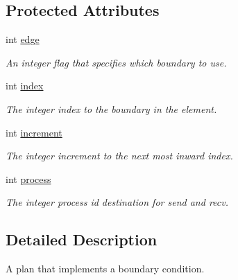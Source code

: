 \subsection*{Protected Attributes}
\begin{DoxyCompactItemize}
\item 
\hypertarget{classbases_1_1boundary_a6455066e38aea0a30e848a57c5465aa1}{int \hyperlink{classbases_1_1boundary_a6455066e38aea0a30e848a57c5465aa1}{edge}}\label{classbases_1_1boundary_a6455066e38aea0a30e848a57c5465aa1}

\begin{DoxyCompactList}\small\item\em An integer flag that specifies which boundary to use. \end{DoxyCompactList}\item 
\hypertarget{classbases_1_1boundary_a1e30d39fa400af6803eab559d6620314}{int \hyperlink{classbases_1_1boundary_a1e30d39fa400af6803eab559d6620314}{index}}\label{classbases_1_1boundary_a1e30d39fa400af6803eab559d6620314}

\begin{DoxyCompactList}\small\item\em The integer index to the boundary in the element. \end{DoxyCompactList}\item 
\hypertarget{classbases_1_1boundary_a3583d7718a34c668465241d86822de24}{int \hyperlink{classbases_1_1boundary_a3583d7718a34c668465241d86822de24}{increment}}\label{classbases_1_1boundary_a3583d7718a34c668465241d86822de24}

\begin{DoxyCompactList}\small\item\em The integer increment to the next most inward index. \end{DoxyCompactList}\item 
\hypertarget{classbases_1_1boundary_a601cc576fbbb9526840e419c318a6c93}{int \hyperlink{classbases_1_1boundary_a601cc576fbbb9526840e419c318a6c93}{process}}\label{classbases_1_1boundary_a601cc576fbbb9526840e419c318a6c93}

\begin{DoxyCompactList}\small\item\em The integer process id destination for send and recv. \end{DoxyCompactList}\end{DoxyCompactItemize}


\subsection{Detailed Description}
A plan that implements a boundary condition. 



